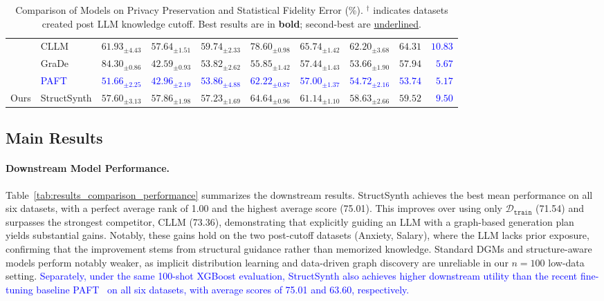 \begin{table}[ht]
{\begin{tabular}{ll llllll cr}
    & CLLM & $61.93_{\pm 4.43}$ & $57.64_{\pm 1.51}$ & $59.74_{\pm 2.33}$ & $78.60_{\pm 0.98}$ & $65.74_{\pm 1.42}$ & $62.20_{\pm 3.68}$ & $64.31$ & \textcolor{blue}{$10.83$} \\
    & GraDe & $84.30_{\pm 0.86}$ & $42.59_{\pm 0.93}$ & $53.82_{\pm 2.62}$ & $55.85_{\pm 1.42}$ & $57.44_{\pm 1.43}$ & $53.66_{\pm 1.90}$ & $57.94$ & \textcolor{blue}{$5.67$} \\
    & \textcolor{blue}{PAFT} & \textcolor{blue}{$51.66_{\pm 2.25}$} & \textcolor{blue}{$42.96_{\pm 2.19}$} & \textcolor{blue}{$53.86_{\pm 4.88}$} & \textcolor{blue}{$62.22_{\pm 0.87}$} & \textcolor{blue}{$57.00_{\pm 1.37}$} & \textcolor{blue}{$54.72_{\pm 2.16}$} & \textcolor{blue}{$53.74$} & \textcolor{blue}{$5.17$} \\
    \midrule
    Ours & StructSynth & $57.60_{\pm 3.13}$ & $57.86_{\pm 1.98}$ & $57.23_{\pm 1.69}$ & $64.64_{\pm 0.96}$ & $61.14_{\pm 1.10}$ & $58.63_{\pm 2.66}$ & $59.52$ & \textcolor{blue}{$9.50$} \\
\bottomrule
\end{tabular}}%
\caption{Comparison of Models on Privacy Preservation and Statistical Fidelity Error (\%). $^\dag$ indicates datasets created post LLM knowledge cutoff. Best results are in \textbf{bold}; second-best are \underline{underlined}.}
\label{tab:results_comparison_merged}

\end{table}

\subsection{Main Results}
\paragraph{Downstream Model Performance.}
Table~\ref{tab:results_comparison_performance} summarizes the downstream results. \textsf{StructSynth} achieves the best mean performance on all six datasets, with a perfect average rank of 1.00 and the highest average score (75.01). This improves over using only $\mathcal{D}_\mathtt{train}$ (71.54) and surpasses the strongest competitor, CLLM (73.36), demonstrating that explicitly guiding an LLM with a graph-based generation plan yields substantial gains. Notably, these gains hold on the two post-cutoff datasets (Anxiety, Salary), where the LLM lacks prior exposure, confirming that the improvement stems from structural guidance rather than memorized knowledge. Standard DGMs and structure-aware models perform notably weaker, as implicit distribution learning and data-driven graph discovery are unreliable in our $n=100$ low-data setting.
\textcolor{blue}{Separately, under the same 100-shot XGBoost evaluation, \textsf{StructSynth} also achieves higher downstream utility than the recent fine-tuning baseline PAFT~\cite{xu2024why} on all six datasets, with average scores of 75.01 and 63.60, respectively.}


